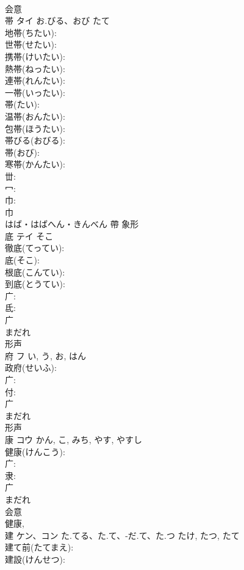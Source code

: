 \documentclass[8pt]{extreport}
\begin{document}
\begin{CJK}{UTF8}{min}
\\	会意 
\\	帯	タイ	お.びる、おび	たて	
\\	地帯(ちたい): 
\\	世帯(せたい): 
\\	携帯(けいたい): 
\\	熱帯(ねったい): 
\\	連帯(れんたい): 
\\	一帯(いったい): 
\\	帯(たい): 
\\	温帯(おんたい): 
\\	包帯(ほうたい): 
\\	帯びる(おびる): 
\\	帯(おび): 
\\	寒帯(かんたい): 
\\	丗: 
\\	冖: 
\\	巾: 
\\	巾	
\\	はば・はばへん・きんべん	帶	象形 
\\	底	テイ	そこ		
\\	徹底(てってい): 
\\	底(そこ): 
\\	根底(こんてい): 
\\	到底(とうてい): 
\\	广: 
\\	氐: 
\\	广	
\\	まだれ	
\\	形声 
\\	府	フ		い, う, お, はん	
\\	政府(せいふ): 
\\	广: 
\\	付: 
\\	广	
\\	まだれ	
\\	形声 
\\	康	コウ		かん, こ, みち, やす, やすし	
\\	健康(けんこう): 
\\	广: 
\\	隶: 
\\	广	
\\	まだれ	
\\	会意 
\\	健康, 
\\	建	ケン、コン	た.てる、た.て、-だ.て、た.つ	たけ, たつ, たて	
\\	建て前(たてまえ): 
\\	建設(けんせつ): 

\end{CJK}
\end{document}
